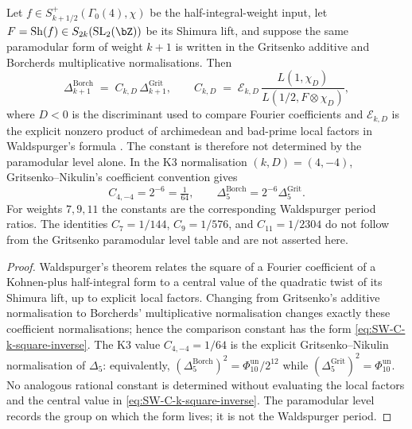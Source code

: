 \begin{theorem}
\label{thm:shimura-waldspurger-higher-weights}
%
%
Let
$f \in S_{k+1/2}^{+}(\Gamma_0(4),\chi)$ be the half-integral-weight
input, let $F=\mathrm{Sh}(f)\in S_{2k}(\mathrm{SL}_2(\bZ))$ be its
Shimura lift, and suppose the same paramodular form of weight
$k+1$ is written in the Gritsenko additive and Borcherds
multiplicative normalisations. Then
\begin{equation}\label{eq:SW-C-k-square-inverse}
 \Delta_{k+1}^{\mathrm{Borch}}
 \;=\;
 C_{k,D}\,\Delta_{k+1}^{\mathrm{Grit}},
 \qquad
 C_{k,D}
 \;=\;
 \mathcal E_{k,D}\,
 \frac{L(1,\chi_D)}
      {L(1/2,F\otimes\chi_D)},
\end{equation}
where $D<0$ is the discriminant used to compare Fourier
coefficients and $\mathcal E_{k,D}$ is the explicit nonzero product
of archimedean and bad-prime local factors in Waldspurger's formula
\cite{Waldspurger81}. The constant is therefore not determined by
the paramodular level alone. In the K3 normalisation
$(k,D)=(4,-4)$, Gritsenko--Nikulin's coefficient convention gives
\begin{equation}\label{eq:SW-C-explicit}
 C_{4,-4}=2^{-6}=\tfrac{1}{64},
 \qquad
 \Delta_5^{\mathrm{Borch}}
 =2^{-6}\Delta_5^{\mathrm{Grit}}.
\end{equation}
For weights $7,9,11$ the constants are the corresponding
Waldspurger period ratios. The identities
$C_7=1/144$, $C_9=1/576$, and $C_{11}=1/2304$ do not follow from
the Gritsenko paramodular level table and are not asserted here.
\end{theorem}

\begin{proof}
Waldspurger's theorem relates the square of a Fourier coefficient
of a Kohnen-plus half-integral form to a central value of the
quadratic twist of its Shimura lift, up to explicit local factors.
Changing from Gritsenko's additive normalisation to Borcherds'
multiplicative normalisation changes exactly these coefficient
normalisations; hence the comparison constant has the form
\eqref{eq:SW-C-k-square-inverse}. The K3 value
$C_{4,-4}=1/64$ is the explicit Gritsenko--Nikulin normalisation of
$\Delta_5$: equivalently,
$(\Delta_5^{\mathrm{Borch}})^2=
\Phi_{10}^{\mathrm{un}}/2^{12}$ while
$(\Delta_5^{\mathrm{Grit}})^2=\Phi_{10}^{\mathrm{un}}$.
No analogous rational constant is determined without evaluating
the local factors and the central value in
\eqref{eq:SW-C-k-square-inverse}. The paramodular level records the
group on which the form lives; it is not the Waldspurger period.
\end{proof}

